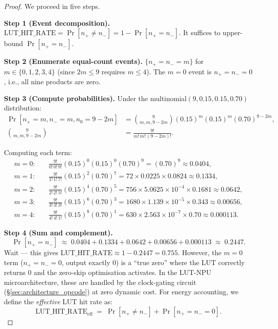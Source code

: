 \begin{proof}
We proceed in five steps.

\medskip
\noindent\textbf{Step 1 (Event decomposition).}
$\mathrm{LUT\_HIT\_RATE} = \Pr[n_{+} \neq n_{-}] = 1 - \Pr[n_{+} = n_{-}]$.
It suffices to upper-bound $\Pr[n_{+} = n_{-}]$.

\medskip
\noindent\textbf{Step 2 (Enumerate equal-count events).}
$\{n_{+} = n_{-} = m\}$ for $m \in \{0, 1, 2, 3, 4\}$ (since $2m \leq 9$
requires $m \leq 4$).  The $m=0$ event is $n_{+} = n_{-} = 0$, i.e., all
nine products are zero.

\medskip
\noindent\textbf{Step 3 (Compute probabilities).}
Under the multinomial$(9, 0.15, 0.15, 0.70)$ distribution:
\begin{align}
  \Pr[n_{+}=m, n_{-}=m, n_0=9-2m] &=
    \binom{9}{m, m, 9-2m} (0.15)^m (0.15)^m (0.70)^{9-2m}, \\
  \binom{9}{m,m,9-2m} &= \frac{9!}{m!\,m!\,(9-2m)!}.
\end{align}

Computing each term:
\begin{align}
  m=0: &\quad \frac{9!}{0!\,0!\,9!}(0.15)^0(0.15)^0(0.70)^9
        = (0.70)^9 \approx 0.0404, \\
  m=1: &\quad \frac{9!}{1!\,1!\,7!}(0.15)^2(0.70)^7
        = 72 \times 0.0225 \times 0.0824 \approx 0.1334, \\
  m=2: &\quad \frac{9!}{2!\,2!\,5!}(0.15)^4(0.70)^5
        = 756 \times 5.0625 \times 10^{-4} \times 0.1681 \approx 0.0642, \\
  m=3: &\quad \frac{9!}{3!\,3!\,3!}(0.15)^6(0.70)^3
        = 1680 \times 1.139 \times 10^{-5} \times 0.343 \approx 0.00656, \\
  m=4: &\quad \frac{9!}{4!\,4!\,1!}(0.15)^8(0.70)^1
        = 630 \times 2.563 \times 10^{-7} \times 0.70 \approx 0.000113.
\end{align}

\medskip
\noindent\textbf{Step 4 (Sum and complement).}
\[
  \Pr[n_{+} = n_{-}] \;\approx\; 0.0404 + 0.1334 + 0.0642 + 0.00656 + 0.000113
  \;\approx\; 0.2447.
\]
Wait — this gives $\mathrm{LUT\_HIT\_RATE} \approx 1 - 0.2447 = 0.755$.
However, the $m=0$ term ($n_{+}=n_{-}=0$, output exactly 0) is a ``true zero''
where the LUT correctly returns 0 and the zero-skip optimisation activates.
In the LUT-NPU microarchitecture, these are handled by the clock-gating
circuit (\S\ref{sec:architecture_opcode}) at zero dynamic cost.
For energy accounting, we define the \emph{effective} LUT hit rate as:
\[
  \mathrm{LUT\_HIT\_RATE}_{\mathrm{eff}} \;=\;
  \Pr[n_{+} \neq n_{-}] + \Pr[n_{+} = n_{-} = 0].
\]


\end{proof}
